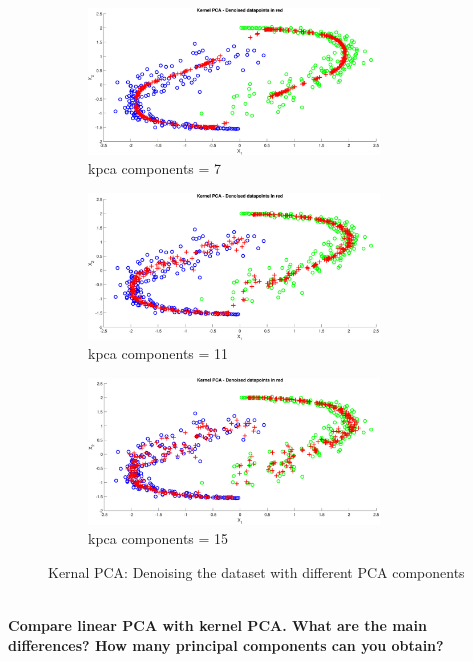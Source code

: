 \begin{figure}[ht]
\begin{subfigure}[b]{0.32\textwidth}
		\centering
		\includegraphics[width = 0.85\textwidth]{Exercise3/Report/pca_nc_7}
		\caption{kpca components = 7 }\label{fig:pca_nc_7}
	\end{subfigure}%
	\begin{subfigure}[b]{0.32\textwidth}
		\centering
		\includegraphics[width = 0.85\textwidth]{Exercise3/Report/pca_nc_11}
		\caption{kpca components = 11 }\label{fig:pca_nc_11}
	\end{subfigure}%
	\begin{subfigure}[b]{0.32\textwidth}
		\centering
		\includegraphics[width = 0.85\textwidth]{Exercise3/Report/pca_nc_15}
		\caption{kpca components = 15}\label{fig:pca_nc_15}
	\end{subfigure}
	\caption{Kernal PCA: Denoising the dataset with different PCA components }
	\label{fig:pca_nc}
\end{figure}\\
\textbf{Compare linear PCA with kernel PCA. What are the main differences? How many
principal components can you obtain?}

